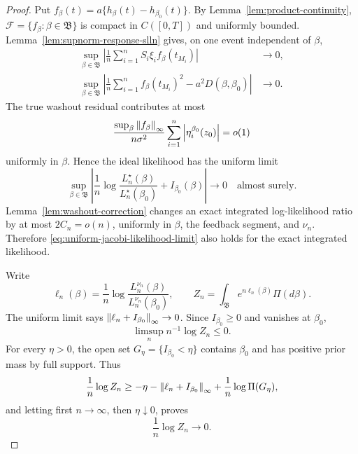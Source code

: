 \begin{proof}
Put \(f_\beta(t)=a\{h_\beta(t)-h_{\beta_0}(t)\}\).  By
Lemma~\ref{lem:product-continuity},
\(\mathcal F=\{f_\beta:\beta\in\mathfrak B\}\) is compact in
\(C([0,T])\) and uniformly bounded.  Lemma~\ref{lem:supnorm-response-slln}
gives, on one event independent of \(\beta\),
\begin{align}
 \sup_{\beta\in\mathfrak B}
 \left|\frac1n\sum_{i=1}^nS_i\xi_i f_\beta(t_{M_i})\right|&\longrightarrow0,
 \label{eq:uniform-score-slln}\\
 \sup_{\beta\in\mathfrak B}
 \left|\frac1n\sum_{i=1}^nf_\beta(t_{M_i})^2
      -a^2D(\beta,\beta_0)\right|&\longrightarrow0.
 \label{eq:uniform-square-slln}
\end{align}
The true washout residual contributes at most
\[
 \frac{\sup_{\beta}\left\|f_\beta\right\|_\infty}{n\sigma^2}
 \sum_{i=1}^n\left|\eta_i^{\beta_0}(z_0)\right|=o(1)
\]
uniformly in \(\beta\).  Hence the ideal likelihood has the uniform limit
\begin{equation}
 \sup_{\beta\in\mathfrak B}
 \left|\frac1n\log\frac{L_n^\star(\beta)}{L_n^\star(\beta_0)}
       +I_{\beta_0}(\beta)\right|\longrightarrow0
 \quad\text{almost surely}.
 \label{eq:uniform-jacobi-likelihood-limit}
\end{equation}
Lemma~\ref{lem:washout-correction} changes an exact integrated log-likelihood
ratio by at most \(2C_n=o(n)\), uniformly in \(\beta\), the feedback segment,
and \(\nu_n\).  Therefore \eqref{eq:uniform-jacobi-likelihood-limit} also
holds for the exact integrated likelihood.

Write
\[
 \ell_n(\beta)=\frac1n\log
 \frac{L_n^{\nu_n}(\beta)}{L_n^{\nu_n}(\beta_0)},
 \qquad Z_n=\int_{\mathfrak B}e^{n\ell_n(\beta)}\Pi(d\beta).
\]
The uniform limit says \(\left\|\ell_n+I_{\beta_0}\right\|_\infty\to0\).  Since
\(I_{\beta_0}\ge0\) and vanishes at \(\beta_0\),
\[
 \limsup_n n^{-1}\log Z_n\le0.
\]
For every \(\eta>0\), the open set
\(G_\eta=\{I_{\beta_0}<\eta\}\) contains \(\beta_0\) and has positive prior
mass by full support.  Thus
\[
 \frac1n\log Z_n\ge-\eta-
 \left\|\ell_n+I_{\beta_0}\right\|_\infty+\frac1n\log\Pi(G_\eta),
\]
and letting first \(n\to\infty\), then \(\eta\downarrow0\), proves
\begin{equation}
 \frac1n\log Z_n\longrightarrow0.
 \label{eq:jacobi-denominator-rate}
\end{equation}


\end{proof}
